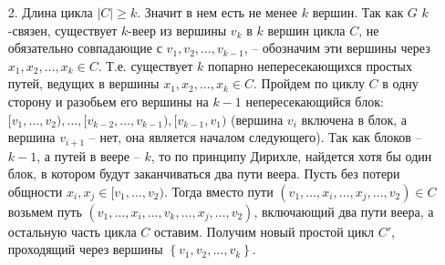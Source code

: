 \documentclass[russian]{article}
\begin{document}
\begin{enumerate}
\item [2.]\setcounter{enumi}{2} Длина цикла $|C| \geqslant k$.
Значит в нем есть не менее $k$ вершин. Так как $G$ $k$-связен,
существует $k$-веер из вершины $v_{k}$ в $k$ вершин цикла $C$,
не обязательно совпадающие с $v_{1},v_{2},\dots,v_{k-1}$, -- обозначим
эти вершины через $x_{1},x_{2},\dots,x_{k}\in C$. Т.е. существует
$k$ попарно непересекающихся простых
путей, ведущих в вершины $x_{1},x_{2},\dots,x_{k}\in C$. Пройдем
по циклу $C$ в одну сторону и разобьем его вершины на $k-1$ непересекающийся блок: $[v_{1},\dots,v_{2}),\ldots, [v_{k-2}, \dots,v_{k-1}), [v_{k-1},v_{1})$ (вершина $v_i$ включена в блок, а вершина $v_{i+1}$ -- нет, она является началом следующего).
Так как блоков -- $k-1$, а путей в веере -- $k$, то по принципу Дирихле, найдется хотя бы один блок, в котором будут заканчиваться два пути веера. Пусть без потери общности $x_{i},x_{j}\in[v_{1},\dots,v_{2})$.
Тогда вместо пути $\left(v_{1},\dots,x_{i},\dots,x_{j},\dots,v_{2}\right)\in C$
возьмем путь $\left(v_{1},\dots,x_{i},\dots,v_{k},\dots,x_{j},\dots,v_{2}\right)$,
включающий два пути веера, а остальную часть цикла $C$ оставим. Получим новый простой цикл $C'$, проходящий через вершины $\left\{ v_{1},v_{2},\dots,v_{k}\right\} $.
\end{enumerate}
\end{document}
